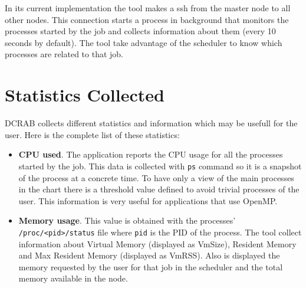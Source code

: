 \documentclass[10pt,a4paper]{report}
\begin{document}
In its current implementation the tool makes a ssh from the master node to all other nodes. This connection starts a process in background that monitors the processes started by the job and collects information about them (every 10 seconds by default). The tool take advantage of the scheduler to know which processes are related to that job.

\section{Statistics Collected}

DCRAB collects different statistics and information which may be usefull for the user. Here is the complete list of these statistics:

\begin{itemize}
	\item \textbf{CPU used}. The application reports the CPU usage for all the processes started by the job. This data is collected with \verb+ps+ command so it is a snapshot of the process at a concrete time. To have only a view of the main processes in the chart there is a threshold value defined to avoid trivial processes of the user. This information is very useful for applications that use OpenMP.
	\item \textbf{Memory usage}. This value is obtained with the processes' \verb+/proc/<pid>/status+ file where \verb+pid+ is the PID of the process. The tool collect information about Virtual Memory (displayed as VmSize), Resident Memory and Max Resident Memory (displayed as VmRSS). Also is displayed the memory requested by the user for that job in the scheduler and the total memory available in the node.


\end{itemize}
\end{document}
